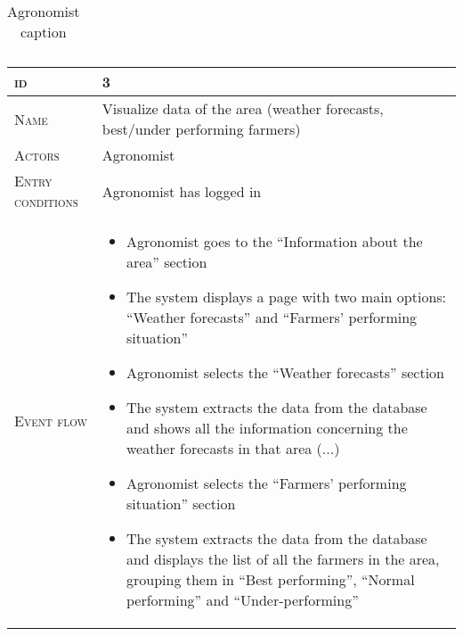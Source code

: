 \begin{table}[H]
\begin{tabular}[c]{|l|p{}|}
    \end{tabular}
    \caption{\label{tab:help_request_section_access}Agronomist caption }
\end{table}



\begin{table}[H]
    \centering
    \begin{tabular}[c]{|l|p{}|}
        \hline %
    	\textsc{id}                 &   3\\
    	\hline %
    	\textsc{Name}               &   Visualize data of the area (weather forecasts, best/under performing farmers)\\
    	\hline %
    	\textsc{Actors}             &   Agronomist\\
    	\hline %
    	\textsc{Entry conditions}   &   Agronomist has logged in\\
    	\hline %
    	\textsc{Event flow}         &   %
            	                        \begin{itemize}
                                    	    \item Agronomist goes to the “Information about the area” section
                                    		\item The system displays a page with two main options: “Weather forecasts” and “Farmers’ performing situation”
                                    		\item Agronomist selects  the “Weather forecasts” section
                                    		\item The system extracts the data from the database and shows all the information concerning the weather forecasts in that area (...)
                                    		\item Agronomist selects the “Farmers’ performing situation” section
                                    		\item The system extracts the data from the database and displays the list of all the farmers in the area, grouping them in “Best performing”, “Normal performing” and “Under-performing”
                                        \end{itemize}\\

\end{tabular}
\end{table}
